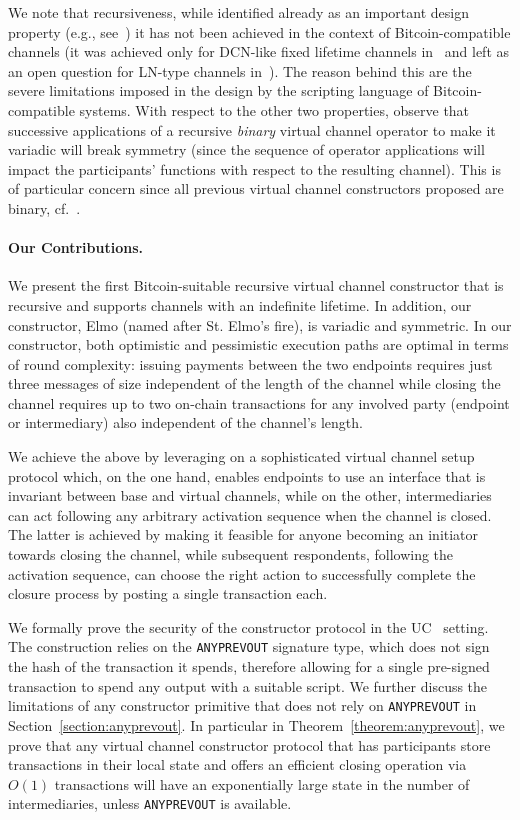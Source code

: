 We note that recursiveness, while identified already as an important design property (e.g., see~\cite{DBLP:conf/ccs/DziembowskiFH18}) it has not been achieved in the context of Bitcoin-compatible channels 
(it was achieved only for DCN-like fixed lifetime channels in~\cite{10.1007/978-3-030-65411-5_18} and left as an open question for LN-type channels in~\cite{cryptoeprint:2020:554}). 
The reason behind this are the severe limitations imposed in the design by the scripting language of Bitcoin-compatible systems. 
%
With respect to the other two properties, observe that successive applications of a recursive {\em binary} virtual channel operator to make it variadic will break symmetry (since the sequence of operator applications will impact the participants' functions with respect to the resulting channel). This is of particular concern since all previous virtual channel constructors proposed are binary, cf.~\cite{DBLP:conf/ccs/DziembowskiFH18,cryptoeprint:2020:554,10.1007/978-3-030-65411-5_18}. 

\paragraph{Our Contributions.}  We present  the first  Bitcoin-suitable
recursive virtual channel constructor that is recursive and supports channels
with an indefinite lifetime. In addition, our constructor, Elmo (named after St.
Elmo's fire), is variadic and symmetric. In our constructor, both optimistic and pessimistic execution paths are optimal in terms of round complexity: issuing payments between the two endpoints requires just three messages of size independent of the length of the channel while
closing the channel requires up to two on-chain transactions for any involved party (endpoint or intermediary) also independent of the channel's length.

We achieve the above by leveraging on a sophisticated virtual channel setup protocol which, on the one hand, enables endpoints to use an interface that is invariant between base and virtual channels, 
while on the other, intermediaries can act following any arbitrary activation sequence when the channel is closed. The latter is achieved by making it feasible for anyone becoming an initiator towards closing the channel, while subsequent respondents, following the activation sequence, can choose the right action to successfully complete the closure process by posting a single transaction each. 

  We formally prove the security of the constructor protocol in the  UC~\cite{uc} setting. The construction relies on the \texttt{ANYPREVOUT}   signature type, which does not sign the hash of the transaction it spends, therefore allowing for a single pre-signed transaction to spend any output
  with a suitable script. We further discuss the limitations of any constructor
  primitive that does not rely on \texttt{ANYPREVOUT} in
  Section~\ref{section:anyprevout}. In particular in Theorem~\ref{theorem:anyprevout},
  we prove that any virtual channel constructor protocol that
  has participants store transactions in their local state
  and offers an efficient closing operation via $O(1)$ transactions
  will have an exponentially large state in the number of intermediaries, unless
  \texttt{ANYPREVOUT} is available. 
